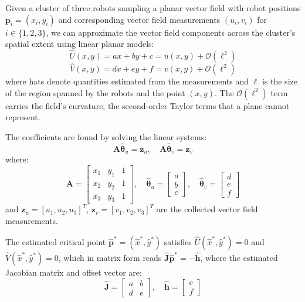 \documentclass[lettersize,journal]{IEEEtran}
\begin{document}
Given a cluster of three robots sampling a planar vector field with robot positions $\mathbf{p}_i = (x_i, y_i)$ and corresponding vector field measurements $(u_i, v_i)$ for $i \in \{1, 2, 3\}$, we can approximate the vector field components across the cluster's spatial extent using linear planar models:
\begin{equation}\label{eq:2}
\hat{U}(x,y) = ax + by + c = u(x,y) + \mathcal{O}(\ell^2)
\end{equation}
\begin{equation}\label{eq:3}
\hat{V}(x,y) = dx + ey + f = v(x,y) + \mathcal{O}(\ell^2)
\end{equation}
where hats denote quantities estimated from the measurements and $\ell$ is the size of the region spanned by the robots and the point $(x,y)$. The $\mathcal{O}(\ell^2)$ term carries the field's curvature, the second-order Taylor terms that a plane cannot represent.

The coefficients are found by solving the linear systems:
\begin{equation}\label{eq:4}
\mathbf{A}\hat{\boldsymbol{\theta}}_u = \mathbf{z}_u, \quad \mathbf{A}\hat{\boldsymbol{\theta}}_v = \mathbf{z}_v
\end{equation}
where:
\begin{equation}\label{eq:5}
\mathbf{A} = \begin{bmatrix} x_1 & y_1 & 1 \\ x_2 & y_2 & 1 \\ x_3 & y_3 & 1 \end{bmatrix}, \quad \hat{\boldsymbol{\theta}}_u = \begin{bmatrix} a \\ b \\ c \end{bmatrix}, \quad \hat{\boldsymbol{\theta}}_v = \begin{bmatrix} d \\ e \\ f \end{bmatrix}
\end{equation}
and $\mathbf{z}_u = [u_1, u_2, u_3]^T$, $\mathbf{z}_v = [v_1, v_2, v_3]^T$ are the collected vector field measurements.

The estimated critical point $\hat{\mathbf{p}}^* = (\hat{x}^*, \hat{y}^*)$ satisfies $\hat{U}(\hat{x}^*, \hat{y}^*) = 0$ and $\hat{V}(\hat{x}^*, \hat{y}^*) = 0$, which in matrix form reads $\hat{\mathbf{J}}\hat{\mathbf{p}}^* = -\hat{\mathbf{h}}$, where the estimated Jacobian matrix and offset vector are:
\begin{equation}\label{eq:8}
\hat{\mathbf{J}} = \begin{bmatrix} a & b \\ d & e \end{bmatrix}, \quad \hat{\mathbf{h}} = \begin{bmatrix} c \\ f \end{bmatrix}
\end{equation}
\end{document}
